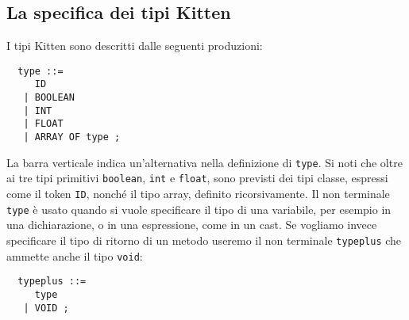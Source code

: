 \subsection{La specifica dei tipi Kitten}\label{subsec:types_specification}
%
I tipi Kitten sono descritti dalle seguenti produzioni:
%
\begin{verbatim}
  type ::=
     ID
   | BOOLEAN
   | INT
   | FLOAT
   | ARRAY OF type ;
\end{verbatim}
%
La barra verticale indica un'alternativa nella definizione di \texttt{type}.
Si noti che oltre ai tre tipi primitivi \texttt{boolean}, \texttt{int}
e \texttt{float}, sono previsti dei tipi classe, espressi come il token
\texttt{ID}, nonch\'e il tipo array, definito ricorsivamente.
Il non terminale \texttt{type} \`e usato quando si vuole specificare
il tipo di una variabile, per esempio in una dichiarazione, o in una
espressione, come in un cast. Se vogliamo invece specificare il tipo
di ritorno di un metodo useremo il
non terminale \texttt{typeplus} che ammette anche il tipo \texttt{void}:
%
\begin{verbatim}
  typeplus ::=
     type
   | VOID ;
\end{verbatim}
%
